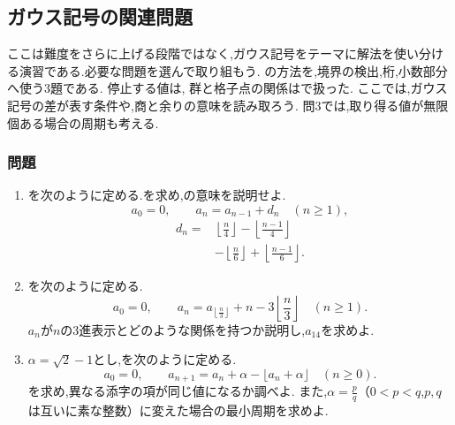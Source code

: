 \subsection{ガウス記号の関連問題}\label{節：ガウス記号の関連問題}

ここは難度をさらに上げる段階ではなく,ガウス記号をテーマに解法を使い分ける演習である.必要な問題を選んで取り組もう.
の方法を,境界の検出,桁,小数部分へ使う3題である.
停止する値は,
群と格子点の関係はで扱った.
ここでは,ガウス記号の差が表す条件や,商と余りの意味を読み取ろう.
問3では,取り得る値が無限個ある場合の周期も考える.

\subsubsection{問題}\label{節：ガウス記号の関連問題：問題}
\begin{enumerate}[label=\textbf{問\arabic*.},leftmargin=3.8em,format=\bookitemlink{practice-gauss}{problem}{hint}]
  \item {}を次のように定める.を求め,の意味を説明せよ.
    \[
      a_0=0,\qquad a_n=a_{n-1}+d_n\quad(n\ge1),
    \]
    \[
      \begin{aligned}
        d_n={}&\left\lfloor\frac n4\right\rfloor
        -\left\lfloor\frac{n-1}{4}\right\rfloor\\
        &-\left\lfloor\frac n6\right\rfloor
        +\left\lfloor\frac{n-1}{6}\right\rfloor.
      \end{aligned}
    \]
  \item {}を次のように定める.
    \[
      a_0=0,\qquad
      a_n=a_{\left\lfloor\frac n3\right\rfloor}
      +n-3\left\lfloor\frac n3\right\rfloor
      \quad(n\ge1).
    \]
    $a_n$が$n$の3進表示とどのような関係を持つか説明し,$a_{14}$を求めよ.
  \item $\alpha=\sqrt2-1$とし,を次のように定める.
    \[
      a_0=0,\qquad
      a_{n+1}=a_n+\alpha-\lfloor a_n+\alpha\rfloor
      \quad(n\ge0).
    \]
    を求め,異なる添字の項が同じ値になるか調べよ.
    また,$\alpha=\frac pq$（$0<p<q$,$p,q$は互いに素な整数）に変えた場合の最小周期を求めよ.
\end{enumerate}

